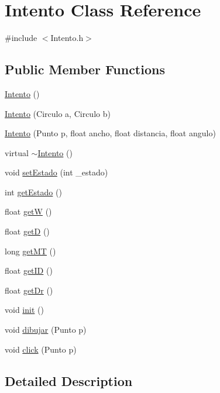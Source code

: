 \hypertarget{class_intento}{
\section{Intento Class Reference}
\label{class_intento}
}


{\ttfamily \#include $<$Intento.h$>$}

\subsection*{Public Member Functions}
\begin{DoxyCompactItemize}
\item 
\hyperlink{class_intento_a858726dfa0128d5f9f8a536ad9bc8074}{Intento} ()
\item 
\hyperlink{class_intento_a6f0a963a2ee59b573b659b73a64ead49}{Intento} (Circulo a, Circulo b)
\item 
\hyperlink{class_intento_ac06896c358aa76d980ee9ac1470b4e4e}{Intento} (Punto p, float ancho, float distancia, float angulo)
\item 
virtual \hyperlink{class_intento_ab9fc0d83763cf3c812abbc8ba7313a91}{$\sim$Intento} ()
\item 
void \hyperlink{class_intento_a68cac1f5ee3b1dc2131a9d9407508b2c}{setEstado} (int \_\-estado)
\item 
int \hyperlink{class_intento_ae32bce8d1370bb1000cebec876a57477}{getEstado} ()
\item 
float \hyperlink{class_intento_ada450578a22bbdc35425b5ddb5c8bee1}{getW} ()
\item 
float \hyperlink{class_intento_a369bfc522fc9052ca9a363a1defa00c9}{getD} ()
\item 
long \hyperlink{class_intento_a8df72be31c030a605a7980ec835a6d83}{getMT} ()
\item 
float \hyperlink{class_intento_af17d828cec8c40d781103904c065937a}{getID} ()
\item 
float \hyperlink{class_intento_a5d7bbc06b8545ae567f2f994cd48de66}{getDr} ()
\item 
void \hyperlink{class_intento_a237eb92e5417e3f26d808edc26407cd7}{init} ()
\item 
void \hyperlink{class_intento_ae8b7fb21ca9924aaa44c396f35b9122c}{dibujar} (Punto p)
\item 
void \hyperlink{class_intento_aa57c7776c229d3aa050b38e3ba6d87da}{click} (Punto p)
\end{DoxyCompactItemize}


\subsection{Detailed Description}


